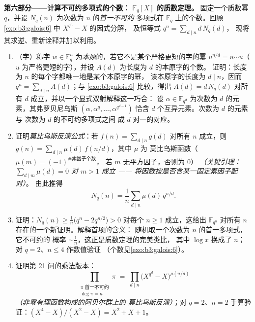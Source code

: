\begin{problem}
\medskip
\noindent\textbf{第六部分——计算不可约多项式的个数：
$\mathbb F_q[X]$ 的质数定理。} 固定一个质数幂
       $q$，并设 $N_q(n)$ 为次数为 $n$ 的\emph{首一不可约}
       多项式在 $\mathbb F_q$ 上的个数。回顾
       \cref{exo:b3:galois:6} 中 $X^{q^n} - X$ 的因式分解，
       及恒等式 $q^n = \sum_{d\mid n}d\,N_q(d)$，
       现将其求逆、重新诠释并加以利用。
\begin{enumerate}[resume]
  \item （字）称字 $w \in \mathbb F_q^n$
        为\emph{本原}的，若它不是某个严格更短的字的幂 $u^{n/d} =
        u\cdots u$（$u$ 为严格更短的字），并设
        $A(d)$ 为长度为 $d$ 的本原字的个数。
        证明：长度为 $n$ 的每个字都唯一地是某个本原字的幂，
        该本原字的长度为 $d \mid n$，因而
        $q^n = \sum_{d \mid n}A(d)$；与
        \cref{exo:b3:galois:6} 比较，得出 $A(d) = d\,N_q(d)$
        对所有 $d$ 成立，并以一个显式双射解释这一巧合：
        设 $\alpha \in
        \mathbb F_{q^d}$ 为次数为 $d$ 的元素，其弗罗贝尼乌斯
        $(\alpha, \alpha^q, \dots, \alpha^{q^{d-1}})$ 恰含
        $d$ 个互异元素。次数为 $d$ 的元素与
        次数为 $d$ 的不可约多项式之间
        成 $d$ 对一的对应。
  \item 证明\emph{莫比乌斯反演公式}：若 $f(n) =
        \sum_{d\mid n}g(d)$ 对所有 $n$ 成立，则 $g(n) =
        \sum_{d\mid n}\mu(d)\,f(n/d)$，其中 $\mu$ 为
        莫比乌斯函数（$\mu(m) = (-1)^{\#\text{素因子个数}}$，
        若 $m$ 无平方因子，否则为 $0$）
        \emph{（关键引理：$\sum_{d \mid m}\mu(d) = 0$ 对 $m >
        1$ 成立 —— 将因数按是否含某一固定素因子配对）}。
        由此推得
        \[
        N_q(n) = \frac1n\sum_{d \mid n}\mu(d)\,q^{n/d} .
        \]
  \item 证明：$N_q(n) \geq \frac1n\bigl(q^n - 2q^{n/2}\bigr) > 0$
        对每个 $n \geq 1$ 成立，这给出 $\mathbb F_{q^n}$
        对所有 $n$ 存在的一个新证明。解释首项的含义：
        随机取一个次数为 $n$ 的首一多项式，它不可约的
        概率 $\sim \frac1n$，这正是质数定理的完美类比，
        其中 $\log x$ 换成了 $n$；
        对 $q = 2$、$n \leq 4$ 作数值验证
        （个数见\cref{exo:b3:galois:6}）。
  \item 证明第 21 问的乘法版本：
        \[
        \prod_{\substack{\pi \text{ 首一不可约}\\ \deg\pi =
        n}}\pi \;=\; \prod_{d \mid n}
        \bigl(X^{q^d} - X\bigr)^{\mu(n/d)}
        \]
        \emph{（非零有理函数构成的阿贝尔群上的
        莫比乌斯反演）}；对 $q
        = 2$、$n = 2$ 手算验证：$(X^4 - X)/(X^2 - X) = X^2 + X + 1$。
\end{enumerate}


\end{problem}
